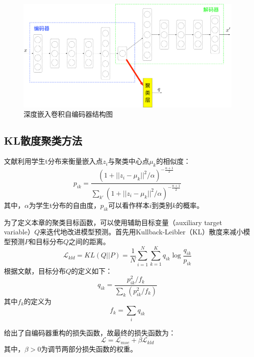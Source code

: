 \begin{figure}[hbt]
	\centering
	\includegraphics[width=13.5cm]{figures/AE/decc}
	\caption{深度嵌入卷积自编码器结构图}
	\label{fig:decc}
\end{figure}

\subsection{KL散度聚类方法}
文献\cite{maaten2008visualizing}利用学生t分布来衡量嵌入点$z_i$与聚类中心点$\mu_k$的相似度：
\begin{equation}
	p_{ik}=\frac{(1+||z_i-\mu_k||^2/\alpha)^{-\frac{\alpha+1}{2}}}{\sum_{k'}(1+||z_i-\mu_k||^2/\alpha)^{-\frac{\alpha+1}{2}}}
	\label{equ:p}
\end{equation}
其中，$\alpha$为学生t分布的自由度，$p_{ik}$可以看作样本$i$到类别$k$的概率。

为了定义本章的聚类目标函数，可以使用辅助目标变量（auxiliary target variable）$Q$来迭代地改进模型预测。首先用Kullback-Leibler（KL）散度来减小模型预测$P$和目标分布$Q$之间的距离。
\begin{equation}
	\mathscr{L}_{kld}=KL(Q||P)=\frac{1}{N}\sum_{i=1}^{N}\sum_{k=1}^{K}q_{ik}\log{\frac{q_{ik}}{p_{ik}}}
	\label{equ:kldfirst}
\end{equation}
根据文献\cite{xie2016unsupervised}，目标分布$Q$的定义如下：
\begin{equation}
	q_{ik}=\frac{p_{ik}^2/f_k}{\sum_k(p_{ik}^2/f_k)}
	\label{equ:traget_distribution}
\end{equation}
其中$f_k$的定义为
\begin{equation}
	f_k=\sum_iq_{ik}
\end{equation}

给出了自编码器重构的损失函数，故最终的损失函数为：
\begin{equation}
	\mathscr{L}=\mathscr{L}_{mse}+\beta \mathscr{L}_{kld}
	\label{equ:l_last}
\end{equation}
其中，$\beta > 0$为调节两部分损失函数的权重。

